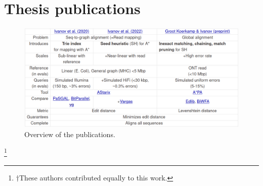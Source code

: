 \chapter*{Thesis publications}

\begin{refsection}[ownpubs]
  \small%
  \nocite{*}
  \printbibliography[heading=none]
\end{refsection}

\begin{figure}[h]
  \includegraphics[width=1.0\linewidth]{media/ownpubs-table.png}
  \caption{Overview of the publications.}
  \label{tab:ownpubs}
\end{figure}

\let\svthefootnote\thefootnote
\let\thefootnote\relax\footnote{$\dagger$These authors contributed equally to this work.}
\addtocounter{footnote}{-1}\let\thefootnote\svthefootnote

%

